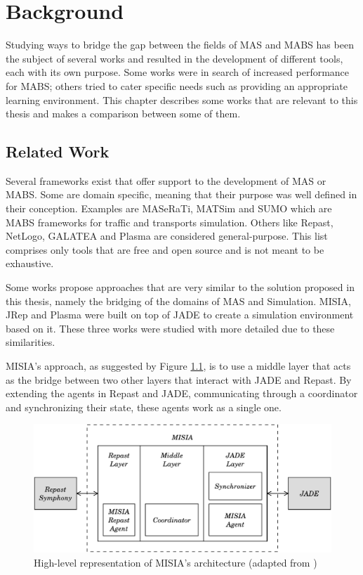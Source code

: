 \chapter{Background}
\label{chap:background}


Studying ways to bridge the gap between the fields of MAS and MABS has been the subject of several works and resulted in the development of different tools, each with its own purpose. Some works were in search of increased performance for MABS; others tried to cater specific needs such as providing an appropriate learning environment. This chapter describes some works that are relevant to this thesis and makes a comparison between some of them.

\section{Related Work}
Several frameworks exist that offer support to the development of MAS or MABS. Some are domain specific, meaning that their purpose was well defined in their conception. Examples are MASeRaTi\cite{ahlbrecht2014scalable}, MATSim\cite{balmer2008agent} and SUMO\cite{SUMO2012} which are MABS frameworks for traffic and transports simulation. Others like Repast\cite{collier2003repast}, NetLogo\cite{tisue2004netlogo}, GALATEA\cite{davila2000galatea} and Plasma\cite{warden2010towards} are considered general-purpose. This list comprises only tools that are free and open source and is not meant to be exhaustive.

Some works propose approaches that are very similar to the solution proposed in this thesis, namely the bridging of the domains of MAS and Simulation. MISIA, JRep and Plasma were built on top of JADE to create a simulation environment based on it. These three works were studied with more detailed due to these similarities.

MISIA's approach, as suggested by Figure \ref{fig:misia}, is to use a middle layer that acts as the bridge between two other layers that interact with JADE and Repast. By extending the agents in Repast and JADE, communicating through a coordinator and synchronizing their state, these agents work as a single one.

\begin{figure}[h]
	\centering
	\includegraphics[width=0.75\linewidth]{figures/MISIA.pdf}
	\caption[MISIA's architecture]{High-level representation of MISIA's architecture (adapted from \cite{garcia2011misia})}
	\label{fig:misia}
\end{figure}

